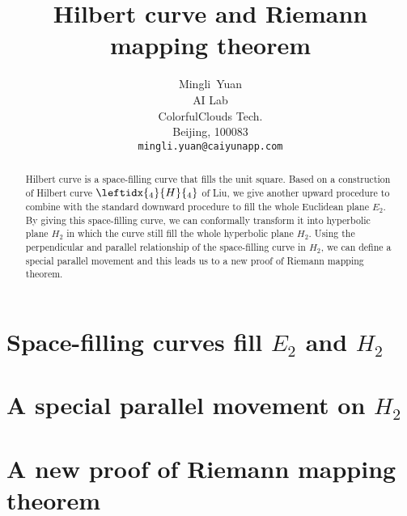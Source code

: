 \documentclass{article}
\title{Hilbert curve and Riemann mapping theorem}
\author{
  Mingli~Yuan \\
  AI Lab \\
  ColorfulClouds Tech.\\
  Beijing, 100083 \\
  \texttt{mingli.yuan@caiyunapp.com} \\
}
\begin{document}
\maketitle

\begin{abstract}
    Hilbert curve is a space-filling curve that fills the unit square. Based on a construction of Hilbert curve $\leftidx{_4}{H}{_4}$ of Liu,
    we give another upward procedure to combine with the standard downward procedure to fill the whole Euclidean plane $E_2$.
    By giving this space-filling curve, we can conformally transform it into hyperbolic plane $H_2$ in which the curve still fill
    the whole hyperbolic plane $H_2$. Using the perpendicular and parallel relationship of the space-filling curve in $H_2$,
    we can define a special parallel movement and this leads us to a new proof of Riemann mapping theorem.
\end{abstract}


\setcounter{tocdepth}{2}
\tableofcontents

\section{Space-filling curves fill $E_2$ and $H_2$}\label{sec:space-filling}

\section{A special parallel movement on $H_2$}\label{sec:parallel-movement}

\section{A new proof of Riemann mapping theorem}\label{sec:riemann-mapping}
\end{document}
